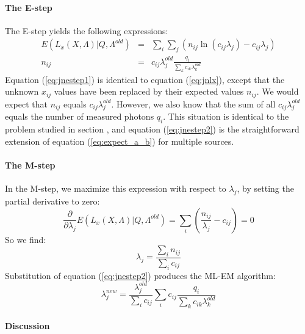 \paragraph{The E-step\\}
The E-step yields the following expressions:
\begin{eqnarray}
E(L_x(X, \Lambda) | Q, \Lambda^{old}) & = & 
   \sum_i \sum_j ( n_{ij} \ln (c_{ij} \lambda_j) -  c_{ij} \lambda_j)
   \label{eq:jnestep1}\\
n_{ij} & = & c_{ij} \lambda_j^{old} \frac{q_i}{\sum_k c_{ik} \lambda_k^{old}}
   \label{eq:jnestep2}
\end{eqnarray}
Equation (\ref{eq:jnestep1}) is identical to equation (\ref{eq:jnlx}), except
that the unknown $x_{ij}$ values have been replaced by their expected values
$n_{ij}$. We would expect that $n_{ij}$ equals $c_{ij}
\lambda_j^{old}$. However, we also know that the sum of all $c_{ij}
\lambda_j^{old}$ equals the number of measured photons $q_i$. This situation
is identical to the problem studied in section , and 
equation (\ref{eq:jnestep2}) is the straightforward extension of equation
(\ref{eq:expect_a_b}) for multiple sources.

\paragraph{The M-step\\}
In the M-step, we maximize this expression with respect to $\lambda_j$, by
setting the partial derivative to zero:
\begin{equation}
\frac{\partial}{\partial \lambda_j} E(L_x(X, \Lambda) | Q, \Lambda^{old})
   =  \sum_i \left( \frac{n_{ij}}{\lambda_j} - c_{ij} \right) = 0
\end{equation}
So we find:
\begin{equation}
 \lambda_j  =  \frac{\sum_i n_{ij}}{\sum_i c_{ij}} \label{eq:jnmstep}
\end{equation}
Substitution of equation (\ref{eq:jnestep2}) produces the ML-EM
algorithm:
\begin{equation}
  \lambda_j^{new}  =  \frac{\lambda_j^{old}}{\sum_i c_{ij}}
           \sum_i c_{ij}  \frac{q_i}{\sum_k c_{ik} \lambda_k^{old}}
           \label{eq:jnmlem}
\end{equation}

\paragraph{Discussion\\}

